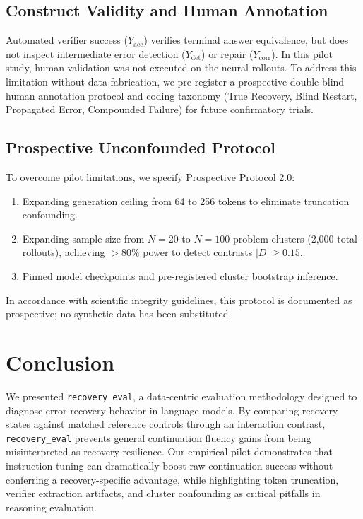 \documentclass[conference]{IEEEtran}
\begin{document}
\subsection{Construct Validity and Human Annotation}
Automated verifier success ($Y_{\text{acc}}$) verifies terminal answer equivalence, but does not inspect intermediate error detection ($Y_{\text{det}}$) or repair ($Y_{\text{corr}}$). In this pilot study, human validation was not executed on the neural rollouts. To address this limitation without data fabrication, we pre-register a prospective double-blind human annotation protocol and coding taxonomy (True Recovery, Blind Restart, Propagated Error, Compounded Failure) for future confirmatory trials.

\subsection{Prospective Unconfounded Protocol}
To overcome pilot limitations, we specify Prospective Protocol 2.0:
\begin{enumerate}
    \item Expanding generation ceiling from 64 to 256 tokens to eliminate truncation confounding.
    \item Expanding sample size from $N=20$ to $N=100$ problem clusters (2,000 total rollouts), achieving $>80\%$ power to detect contrasts $|D| \ge 0.15$.
    \item Pinned model checkpoints and pre-registered cluster bootstrap inference.
\end{enumerate}
In accordance with scientific integrity guidelines, this protocol is documented as prospective; no synthetic data has been substituted.

\section{Conclusion}
We presented \texttt{recovery\_eval}, a data-centric evaluation methodology designed to diagnose error-recovery behavior in language models. By comparing recovery states against matched reference controls through an interaction contrast, \texttt{recovery\_eval} prevents general continuation fluency gains from being misinterpreted as recovery resilience. Our empirical pilot demonstrates that instruction tuning can dramatically boost raw continuation success without conferring a recovery-specific advantage, while highlighting token truncation, verifier extraction artifacts, and cluster confounding as critical pitfalls in reasoning evaluation.



\end{document}
